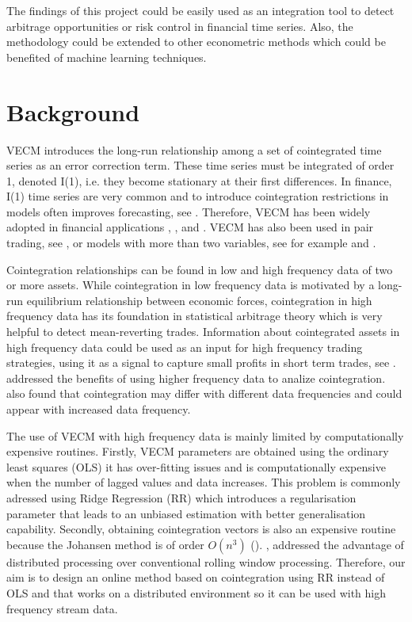 \documentclass[12pt,reqno]{amsart}
\begin{document}
The findings of this project could be easily used as an integration tool
to detect arbitrage opportunities or risk control in financial time series. Also, the methodology could be extended to other econometric methods which could be benefited of machine learning techniques.

\section{Background}

VECM introduces the long-run
relationship among a set of cointegrated time series as an error correction
term. These time series must be integrated of order 1, denoted I(1), i.e. they
become stationary at their first differences. In finance, I(1) time series are
very common and to introduce cointegration restrictions in models often improves
forecasting, see \cite{duy1998}. Therefore, VECM has been widely adopted in
financial applications \cite{mukherjee1995}, \cite{seong2013},
\cite{maysami2000} and \cite{arestis2001}. VECM has also been used in pair
trading, see \cite{herlemont2003}, or models with more than two variables, see
for example \cite{mukherjee1995} and \cite{engle2004}.

Cointegration relationships can be found in low and high frequency data of two or
more assets. While cointegration in low frequency data is motivated by a
long-run equilibrium relationship between economic forces, cointegration in high
frequency data has its foundation in statistical arbitrage theory which is very helpful
to detect mean-reverting trades. Information about cointegrated assets in high
frequency data could be used as an input for high frequency trading strategies,
using it as a signal to capture small profits in short term trades, see
\cite{miao2014}. \cite{zhou2001} addressed the benefits of using higher
frequency data to analize cointegration. \cite{rittler2012} also found that
cointegration may differ with different data frequencies and could appear
with increased data frequency.

The use of VECM with high frequency data is mainly limited by computationally
expensive routines. Firstly, VECM parameters are obtained using the ordinary
least squares (OLS) it has over-fitting
issues and is computationally expensive when
the number of lagged values and data increases. This problem is commonly adressed using
Ridge Regression (RR) \cite{hoerl1970} which introduces a regularisation
parameter that leads to an unbiased estimation with better generalisation
capability. Secondly, obtaining
cointegration vectors is also an expensive routine because the Johansen method 
is of order $O(n^3)$ (\cite{johansen1995}).
\cite{chen2003}, \cite{Arce2017} addressed the advantage of distributed processing over
conventional rolling window processing. Therefore, our aim is to design
an online method based on cointegration using RR instead of OLS and that works on a distributed environment so it can be used with high frequency stream data. 
\end{document}
